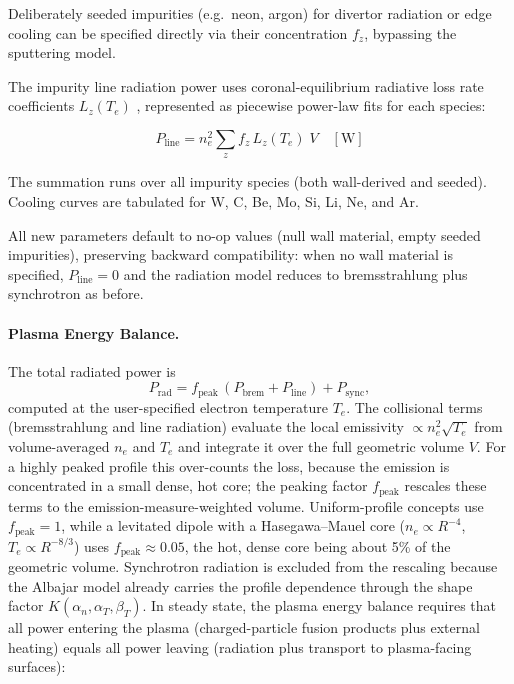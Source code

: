 \documentclass{article}
\begin{document}
Deliberately seeded impurities (e.g.\ neon, argon) for divertor
radiation or edge cooling can be specified directly via their
concentration $f_z$, bypassing the sputtering model.

The impurity line radiation power uses coronal-equilibrium radiative
loss rate coefficients $L_z(T_e)$
\citep{post1977, mavrin2018}, represented as piecewise
power-law fits for each species:

\begin{equation}
\label{eq:p-line}
P_{\text{line}} = n_e^2 \sum_z f_z \, L_z(T_e) \; V \quad [\text{W}]
\end{equation}

\noindent The summation runs over all impurity species (both
wall-derived and seeded). Cooling curves are tabulated for W, C, Be,
Mo, Si, Li, Ne, and Ar.

All new parameters default to no-op values (null wall material, empty
seeded impurities), preserving backward compatibility: when no wall
material is specified, $P_{\text{line}} = 0$ and the radiation model
reduces to bremsstrahlung plus synchrotron as before.

\paragraph{Plasma Energy Balance.}

The total radiated power is
\begin{equation}
\label{eq:p-rad}
P_{\text{rad}} = f_{\text{peak}}\,(P_{\text{brem}} + P_{\text{line}})
  + P_{\text{sync}},
\end{equation}
computed at the user-specified electron temperature $T_e$. The
collisional terms (bremsstrahlung and line radiation) evaluate the
local emissivity $\propto n_e^2\sqrt{T_e}$ from volume-averaged $n_e$
and $T_e$ and integrate it over the full geometric volume $V$. For a
highly peaked profile this over-counts the loss, because the emission
is concentrated in a small dense, hot core; the peaking factor
$f_{\text{peak}}$ rescales these terms to the emission-measure-weighted
volume. Uniform-profile concepts use $f_{\text{peak}} = 1$, while a
levitated dipole with a Hasegawa--Mauel core ($n_e \propto R^{-4}$,
$T_e \propto R^{-8/3}$) uses $f_{\text{peak}} \approx 0.05$, the hot,
dense core being about 5\% of the geometric volume. Synchrotron
radiation is excluded from the rescaling because the Albajar model
already carries the profile dependence through the shape factor
$K(\alpha_n, \alpha_T, \beta_T)$.
In steady state, the plasma energy balance requires that all power
entering the plasma (charged-particle fusion products plus external
heating) equals all power leaving (radiation plus transport to
plasma-facing surfaces):
\end{document}
